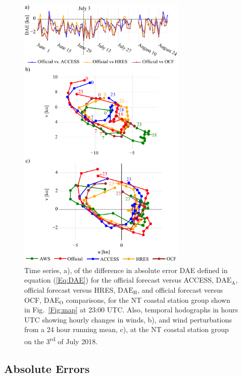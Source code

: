\documentclass[twocol]{ametsoc}
\begin{document}
\begin{figure}
\centering
\includegraphics[width=19pc]{case_studies_nt.pdf}
\caption{Time series, a), of the difference in absolute error DAE defined in equation (\ref{Eq:DAE}) for the official forecast versus ACCESS, $\text{DAE}_\text{A}$, official forecast versus HRES, $\text{DAE}_\text{H}$, and official forecast versus OCF, $\text{DAE}_\text{O}$ comparisons, for the NT coastal station group shown in Fig.~\ref{Fig:map} at 23:00 UTC. Also, temporal hodographs in hours UTC showing hourly changes in winds, b), and wind perturbations from a 24 hour running mean, c), at the NT coastal station group on the 3\textsuperscript{rd} of July 2018.}
\label{Fig:case_studies_nt}
\end{figure}

\subsection{Absolute Errors}
\label{Sec:Daily}
\end{document}
